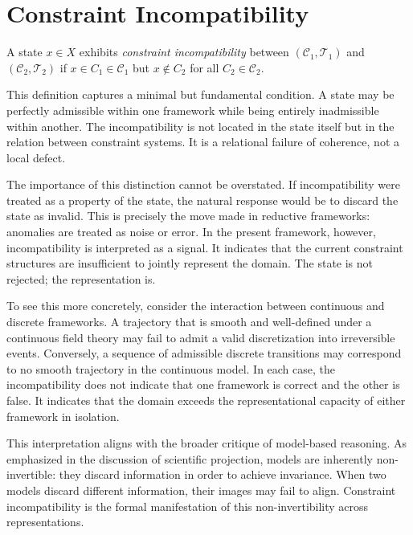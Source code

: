\documentclass[11pt,openany]{book}
\begin{document}
\section{Constraint Incompatibility}
\label{sec:definition-incompatibility}

\begin{definition}
\label{def:incompatibility}
A state $x \in X$ exhibits \emph{constraint
incompatibility} between $(\mathcal{C}_1, \mathcal{T}_1)$
and $(\mathcal{C}_2, \mathcal{T}_2)$ if $x \in C_1 \in
\mathcal{C}_1$ but $x \notin C_2$ for all $C_2 \in
\mathcal{C}_2$.
\end{definition}

This definition captures a minimal but fundamental
condition. A state may be perfectly admissible within one
framework while being entirely inadmissible within another.
The incompatibility is not located in the state itself but
in the relation between constraint systems. It is a
relational failure of coherence, not a local defect.

The importance of this distinction cannot be overstated.
If incompatibility were treated as a property of the state,
the natural response would be to discard the state as
invalid. This is precisely the move made in reductive
frameworks: anomalies are treated as noise or error. In the
present framework, however, incompatibility is interpreted
as a signal. It indicates that the current constraint
structures are insufficient to jointly represent the domain.
The state is not rejected; the representation is.

To see this more concretely, consider the interaction
between continuous and discrete frameworks. A trajectory
that is smooth and well-defined under a continuous field
theory may fail to admit a valid discretization into
irreversible events. Conversely, a sequence of admissible
discrete transitions may correspond to no smooth trajectory
in the continuous model. In each case, the incompatibility
does not indicate that one framework is correct and the
other is false. It indicates that the domain exceeds the
representational capacity of either framework in isolation.

This interpretation aligns with the broader critique of
model-based reasoning. As emphasized in the discussion of
scientific projection, models are inherently
non-invertible: they discard information in order to
achieve invariance. When two models discard different
information, their images may fail to align. Constraint
incompatibility is the formal manifestation of this
non-invertibility across representations.
\end{document}

